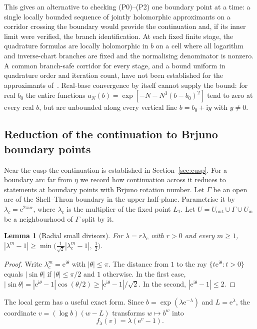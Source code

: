 \documentclass[11pt]{amsart}
\newtheorem{lemma}[theorem]{Lemma}
\theoremstyle{definition}
\newcommand{\eee}{\mathrm{e}}
\newcommand{\ii}{\mathrm{i}}
\begin{document}
This gives an alternative to checking (P0)--(P2) one boundary point at a
time: a single locally bounded sequence of jointly holomorphic
approximants on a corridor crossing the boundary would provide the
continuation and, if its inner limit were verified, the branch
identification.  At each fixed finite stage, the quadrature formulas are locally
holomorphic in $b$ on a cell where all logarithm and inverse-chart
branches are fixed and the normalising denominator is nonzero.  A
common branch-safe corridor for every stage, and a bound uniform in
quadrature order and iteration count, have not been established for
the approximants of~\cite[\S5]{Paulsen2019}.  Real-base convergence by itself
cannot supply the bound: for real $b_0$ the entire functions
$a_N(b)=\exp[-N-N^3(b-b_0)^2]$ tend to zero at every real $b$, but
are unbounded along every vertical line $b=b_0+\ii y$ with $y\ne0$.

\subsection{Reduction of the continuation to Brjuno boundary points}\label{sec:brjuno}
Near the cusp the continuation is established in Section~\ref{sec:cusp}.
For a boundary arc far from $\eta$ we record how continuation across it
reduces to statements at boundary points with Brjuno rotation number.  Let $\Gamma$ be an open arc of the
Shell--Thron boundary in the upper half-plane.  Parametrise it by
$\lambda_c=\eee^{2\pi\ii\alpha}$, where $\lambda_c$ is the multiplier of the fixed
point $L_1$.  Let $U=U_{\mathrm{out}}\cup\Gamma\cup U_{\mathrm{in}}$ be a
neighbourhood of $\Gamma$ split by it.

\begin{lemma}[Radial small divisors]\label{lem:radial}
For $\lambda=r\lambda_c$ with $r>0$ and every $m\ge1$,
$|\lambda^m-1|\ge\min\bigl(\tfrac1{\sqrt2}|\lambda_c^m-1|,\ \tfrac12\bigr)$.
\end{lemma}

\begin{proof}
Write $\lambda_c^m=\eee^{\ii\theta}$ with $|\theta|\le\pi$.  The distance from $1$
to the ray $\{t\eee^{\ii\theta}:t>0\}$ equals $|\sin\theta|$ if
$|\theta|\le\pi/2$ and $1$ otherwise.  In the first case,
$|\sin\theta|=|\eee^{\ii\theta}-1|\cos(\theta/2)\ge|\eee^{\ii\theta}-1|/\sqrt2$.  In
the second, $|\eee^{\ii\theta}-1|\le2$.
\end{proof}

The local germ has a useful exact form.  Since
$b=\exp(\lambda\eee^{-\lambda})$ and $L=\eee^\lambda$, the coordinate
$v=(\log b)(w-L)$ transforms $w\mapsto b^w$ into
\begin{equation}\label{eq:radial-normal-form}
  f_\lambda(v)=\lambda(\eee^v-1).
\end{equation}
\end{document}
